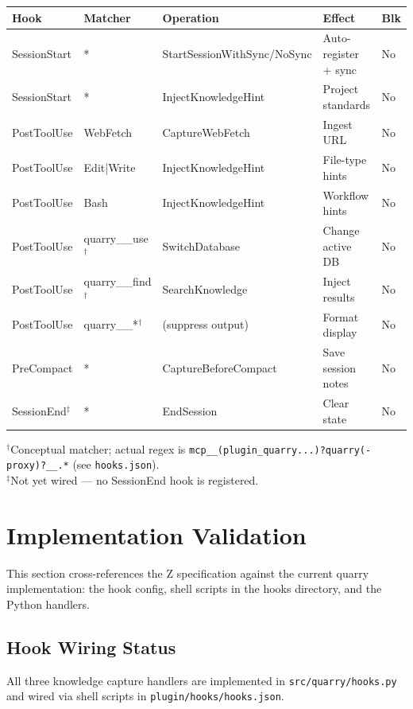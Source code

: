 \documentclass[a4paper,10pt,fleqn]{article}
\begin{document}
{\small
\begin{tabular}{llp{3.2cm}p{2.8cm}l}
\hline
\textbf{Hook} & \textbf{Matcher} & \textbf{Operation} &
  \textbf{Effect} & \textbf{Blk} \\
\hline
SessionStart & * & StartSession\-WithSync/\-NoSync &
  Auto-register + sync & No \\
SessionStart & * & InjectKnowledge\-Hint &
  Project standards & No \\
PostToolUse & WebFetch & CaptureWebFetch &
  Ingest URL & No \\
PostToolUse & Edit|Write & InjectKnowledge\-Hint &
  File-type hints & No \\
PostToolUse & Bash & InjectKnowledge\-Hint &
  Workflow hints & No \\
PostToolUse & quarry\_\_use$^\dagger$ & SwitchDatabase &
  Change active DB & No \\
PostToolUse & quarry\_\_find$^\dagger$ & SearchKnowledge &
  Inject results & No \\
PostToolUse & quarry\_\_*$^\dagger$ & (suppress output) &
  Format display & No \\
PreCompact & * & CaptureBefore\-Compact &
  Save session notes & No \\
SessionEnd$^\ddagger$ & * & EndSession &
  Clear state & No \\
\hline
\end{tabular}
}

\noindent
$^\dagger$Conceptual matcher; actual regex is
\texttt{mcp\_\_(plugin\_quarry...)?quarry(-proxy)?\_\_.*}
(see \texttt{hooks.json}).\\
$^\ddagger$Not yet wired --- no SessionEnd hook is registered.

\section{Implementation Validation}

This section cross-references the Z specification against
the current quarry implementation: the hook config, shell
scripts in the hooks directory, and the Python handlers.

\subsection{Hook Wiring Status}

All three knowledge capture handlers are implemented in
\texttt{src/quarry/hooks.py} and wired via shell scripts in
\texttt{plugin/hooks/hooks.json}.
\end{document}
